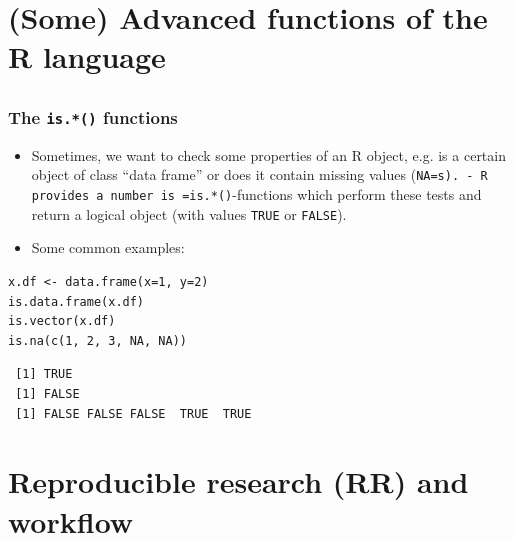 \documentclass[bigger]{beamer}
\begin{document}
\section{(Some) Advanced functions of the R language}
\label{sec-6}
\subsection{}
\begin{frame}[fragile,label=slide_is_function]
\frametitle{The \texttt{is.*()} functions}
\label{sec-6-1-1}

\begin{itemize}
\item Sometimes, we want to check some properties of an R object, e.g. is a
      certain object of class \enquote{data frame} or does it contain missing values (\texttt{NA=s).     - R provides a number is =is.*()}-functions which perform these tests and
      return a logical object (with values \texttt{TRUE} or \texttt{FALSE}).
\item Some common examples:
\end{itemize}


\lstset{language=R}
\begin{lstlisting}
x.df <- data.frame(x=1, y=2)
is.data.frame(x.df)
is.vector(x.df)
is.na(c(1, 2, 3, NA, NA))
\end{lstlisting}

\begin{verbatim}
 [1] TRUE
 [1] FALSE
 [1] FALSE FALSE FALSE  TRUE  TRUE
\end{verbatim}
\end{frame}
\section{Reproducible research (RR) and workflow}
\label{sec-7}
\end{document}
